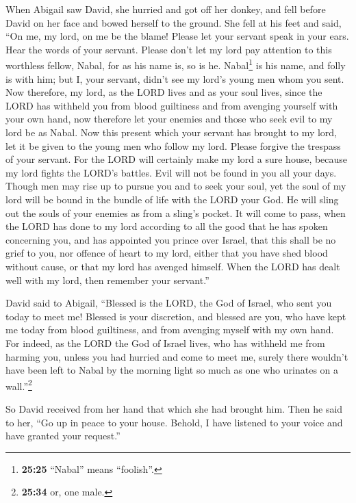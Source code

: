  When Abigail saw David, she hurried and got off her
donkey, and fell before David on her face and bowed herself to the
ground.  She fell at his feet and said, ``On me, my lord,
on me be the blame! Please let your servant speak in your ears. Hear the
words of your servant.  Please don't let my lord pay
attention to this worthless fellow, Nabal, for as his name is, so is he.
Nabal\footnote{\textbf{25:25} ``Nabal'' means ``foolish''.} is his name,
and folly is with him; but I, your servant, didn't see my lord's young
men whom you sent.  Now therefore, my lord, as the LORD
lives and as your soul lives, since the LORD has withheld you from blood
guiltiness and from avenging yourself with your own hand, now therefore
let your enemies and those who seek evil to my lord be as Nabal.
 Now this present which your servant has brought to my
lord, let it be given to the young men who follow my lord.
 Please forgive the trespass of your servant. For the
LORD will certainly make my lord a sure house, because my lord fights
the LORD's battles. Evil will not be found in you all your days.
 Though men may rise up to pursue you and to seek your
soul, yet the soul of my lord will be bound in the bundle of life with
the LORD your God. He will sling out the souls of your enemies as from a
sling's pocket.  It will come to pass, when the LORD has
done to my lord according to all the good that he has spoken concerning
you, and has appointed you prince over Israel,  that this
shall be no grief to you, nor offence of heart to my lord, either that
you have shed blood without cause, or that my lord has avenged himself.
When the LORD has dealt well with my lord, then remember your servant.''

 David said to Abigail, ``Blessed is the LORD, the God of
Israel, who sent you today to meet me!  Blessed is your
discretion, and blessed are you, who have kept me today from blood
guiltiness, and from avenging myself with my own hand. 
For indeed, as the LORD the God of Israel lives, who has withheld me
from harming you, unless you had hurried and come to meet me, surely
there wouldn't have been left to Nabal by the morning light so much as
one who urinates on a wall.''\footnote{\textbf{25:34} or, one male.}

 So David received from her hand that which she had
brought him. Then he said to her, ``Go up in peace to your house.
Behold, I have listened to your voice and have granted your request.''

